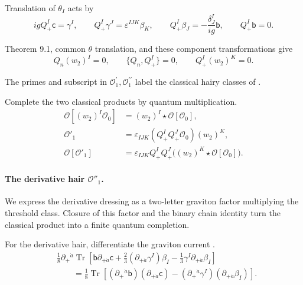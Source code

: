 \documentclass[11pt]{article}
\numberwithin{equation}{section}
\numberwithin{figure}{section}
\numberwithin{table}{section}
\begin{document}
\begin{proofbox}
Translation of $\theta_I$ acts by
\begin{equation}\label{eq-hair-graviton}
igQ_+^I\mathsf c=\gamma^I,\qquad
Q_+^I\gamma^J=\varepsilon^{IJK}\beta_K,\qquad
Q_+^I\beta_J=-\frac{\delta^I_J}{ig}\mathsf b,\qquad
Q_+^I\mathsf b=0.
\end{equation}

Theorem 9.1, common $\theta$ translation, and these component transformations give
\begin{equation}\label{b-00846}
Q_n(w_2)^I=0,\qquad
\{Q_n,Q_+^I\}=0,\qquad Q_+^I(w_2)^K=0.
\end{equation}

The primes and subscript in $\mathcal O^{\prime}_1,\mathcal O^{\prime\prime}_1$ label the classical hairy classes of \cite[Section 3.2]{KKLP}.

Complete the two classical products \cite[Eqs. (3.3)--(3.4)]{KKLP} by quantum multiplication.
\begin{equation}\label{eq-hair-completion}
\begin{aligned}
\mathcal O[(w_2)^I\mathcal O_0]
&=(w_2)^I\star\mathcal O[\mathcal O_0],\\
\mathcal O'_1
&=\varepsilon_{IJK}(Q_+^IQ_+^J\mathcal O_0)(w_2)^K,\\
\mathcal O[\mathcal O'_1]
&=\varepsilon_{IJK}Q_+^IQ_+^J
\bigl((w_2)^K\star\mathcal O[\mathcal O_0]\bigr).
\end{aligned}
\end{equation}

\paragraph{The derivative hair $\mathcal O''_1$.}\label{the-derivative-hair-mathcal-o_1}

We express the derivative dressing as a two-letter graviton factor multiplying the threshold class. Closure of this factor and the binary chain identity turn the classical product into a finite quantum completion.

For the derivative hair, differentiate the graviton current \cite[Eq. (2.14)]{KKLP}.
\begin{equation}\label{eq-hair-current}
\begin{aligned}
&\frac18\partial_+{}^{\dot a}\operatorname{Tr}\!\left[
\mathsf b\partial_{+\dot a}\mathsf c
+\frac23(\partial_{+\dot a}\gamma^I)\beta_I
-\frac13\gamma^I\partial_{+\dot a}\beta_I
\right]\\
&\qquad=\frac18\operatorname{Tr}\!\left[
(\partial_+{}^{\dot a}\mathsf b)(\partial_{+\dot a}\mathsf c)
-(\partial_+{}^{\dot a}\gamma^I)(\partial_{+\dot a}\beta_I)
\right].
\end{aligned}
\end{equation}


\end{proofbox}
\end{document}
